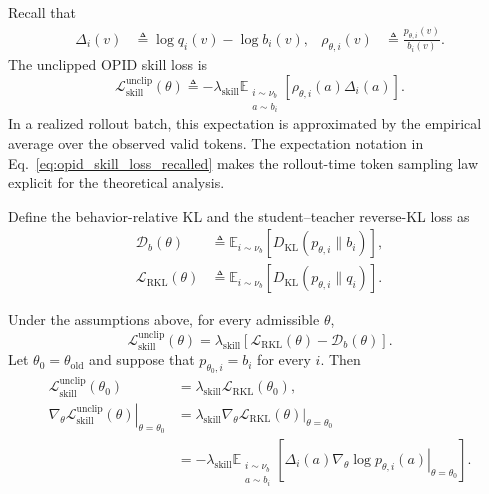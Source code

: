 \documentclass{llmxive}
\begin{document}
Recall that
\begin{equation*}
\begin{aligned}
 \Delta_i(v)
 &\triangleq
 \log q_i(v)-\log b_i(v),
 &
 \rho_{\theta,i}(v)
 &\triangleq
 \frac{p_{\theta,i}(v)}{b_i(v)}.
\end{aligned}
\end{equation*}
The unclipped OPID skill loss is
\begin{equation}
 \mathcal L_{\mathrm{skill}}^{\mathrm{unclip}}(\theta)
 \triangleq
 -
 \lambda_{\mathrm{skill}}
 \mathbb E_{\substack{i\sim\nu_b\\a\sim b_i}}
 \left[
   \rho_{\theta,i}(a)\Delta_i(a)
 \right].
\label{eq:opid_skill_loss_recalled}
\end{equation}
In a realized rollout batch, this expectation is approximated by the
empirical average over the observed valid tokens. The expectation notation in
Eq.~\ref{eq:opid_skill_loss_recalled} makes the rollout-time token sampling
law explicit for the theoretical analysis.

Define the behavior-relative KL and the student--teacher reverse-KL loss as
\begin{equation*}
\begin{aligned}
 \mathcal D_b(\theta)
 &\triangleq
 \mathbb E_{i\sim\nu_b}
 \left[
   D_{\mathrm{KL}}
   \left(
     p_{\theta,i}\|b_i
   \right)
 \right],
 \\
 \mathcal L_{\mathrm{RKL}}(\theta)
 &\triangleq
 \mathbb E_{i\sim\nu_b}
 \left[
   D_{\mathrm{KL}}
   \left(
     p_{\theta,i}\|q_i
   \right)
 \right].
\end{aligned}
\end{equation*}


\begin{proposition}
\label{prop:relative_kl}
Under the assumptions above, for every admissible \(\theta\),
\begin{equation}
 \mathcal L_{\mathrm{skill}}^{\mathrm{unclip}}(\theta)
 =
 \lambda_{\mathrm{skill}}
 \left[
   \mathcal L_{\mathrm{RKL}}(\theta)
   -
   \mathcal D_b(\theta)
 \right].
\label{eq:relative_kl_decomposition}
\end{equation}
Let \(\theta_0=\theta_{\mathrm{old}}\) and suppose that
\(p_{\theta_0,i}=b_i\) for every \(i\). Then
\begin{align}
 \mathcal L_{\mathrm{skill}}^{\mathrm{unclip}}(\theta_0)
 &=
 \lambda_{\mathrm{skill}}
 \mathcal L_{\mathrm{RKL}}(\theta_0),
\label{eq:value_equivalence}
\\
 \left.
 \nabla_\theta
 \mathcal L_{\mathrm{skill}}^{\mathrm{unclip}}(\theta)
 \right|_{\theta=\theta_0}
 &=
 \lambda_{\mathrm{skill}}
 \left.
 \nabla_\theta
 \mathcal L_{\mathrm{RKL}}(\theta)
 \right|_{\theta=\theta_0}
\label{eq:gradient_equivalence}
\\
 &=
 -
 \lambda_{\mathrm{skill}}
 \mathbb E_{\substack{i\sim\nu_b\\a\sim b_i}}
 \left[
   \Delta_i(a)
   \left.
   \nabla_\theta
   \log p_{\theta,i}(a)
   \right|_{\theta=\theta_0}
 \right].
\label{eq:sampled_local_gradient}
\end{align}
\end{proposition}
\end{document}
